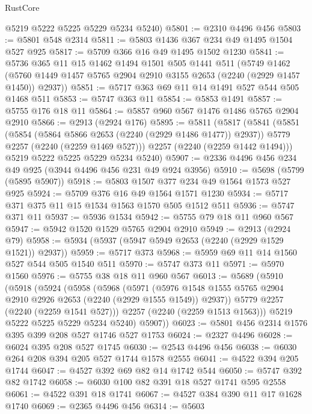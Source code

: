 \begin{lexlean}{RustCore}
\begin{coremodule}
      @5219
      @5222
      @5225
      @5229
      @5234
      @5240)
@5801 := @2310 @4496 @456
@5803 := @5801 @548 @2314
@5811 := @5803 @1436 @367 @234 @49 @1495 @1504 @527 @925
@5817 := @5709 @366 @16 @49 @1495 @1502 @1230
@5841 := @5736
    @365
    @11
    @15
    @1462
    @1494
    @1501
    @505
    @1441
    @511
    (@5749
      @1462
      (@5760 @1449 @1457 @5765 @2904 @2910 @3155 @2653 (@2240 (@2929 @1457 @1450)) @2937))
@5851 := @5717 @363 @69 @11 @14 @1491 @527 @544 @505 @1468 @511
@5853 := @5747 @363 @11
@5854 := @5853 @1491
@5857 := @5755 @176 @18 @11
@5864 := @5857 @960 @567 @1476 @1486 @5765 @2904 @2910
@5866 := @2913 (@2924 @176)
@5895 := @5811
    (@5817
      (@5841
        (@5851
          (@5854 (@5864 @5866 @2653 (@2240 (@2929 @1486 @1477)) @2937))
          @5779
          @2257
          (@2240 (@2259 @1469 @527)))
        @2257
        (@2240 (@2259 @1442 @1494)))
      @5219
      @5222
      @5225
      @5229
      @5234
      @5240)
@5907 := @2336 @4496 @456 @234 @49 @925 (@3944 @4496 @456 @231 @49 @924 @3956)
@5910 := @5698 (@5799 (@5895 @5907))
@5918 := @5803 @1507 @377 @234 @49 @1564 @1573 @527 @925
@5924 := @5709 @376 @16 @49 @1564 @1571 @1230
@5934 := @5717 @371 @375 @11 @15 @1534 @1563 @1570 @505 @1512 @511
@5936 := @5747 @371 @11
@5937 := @5936 @1534
@5942 := @5755 @79 @18 @11 @960 @567
@5947 := @5942 @1520 @1529 @5765 @2904 @2910
@5949 := @2913 (@2924 @79)
@5958 := @5934 (@5937 (@5947 @5949 @2653 (@2240 (@2929 @1529 @1521)) @2937))
@5959 := @5717 @373
@5968 := @5959 @69 @11 @14 @1560 @527 @544 @505 @1540 @511
@5970 := @5747 @373 @11
@5971 := @5970 @1560
@5976 := @5755 @38 @18 @11 @960 @567
@6013 := @5689
    (@5910
      (@5918
        (@5924
          (@5958
            (@5968
              (@5971
                (@5976 @1548 @1555 @5765 @2904 @2910 @2926 @2653 (@2240 (@2929 @1555 @1549)) @2937))
              @5779
              @2257
              (@2240 (@2259 @1541 @527)))
            @2257
            (@2240 (@2259 @1513 @1563)))
          @5219
          @5222
          @5225
          @5229
          @5234
          @5240)
        @5907))
@6023 := @5801 @456 @2314 @1576 @395 @399 @208 @527 @1746 @527 @1753
@6024 := @2327 @4496
@6028 := @6024 @395 @208 @527 @1745
@6030 := @2543 @4496 @456
@6038 := @6030 @264 @208 @394 @205 @527 @1744 @1578 @2555
@6041 := @4522 @394 @205 @1744
@6047 := @4527 @392 @69 @82 @14 @1742 @544
@6050 := @5747 @392 @82 @1742
@6058 := @6030 @100 @82 @391 @18 @527 @1741 @595 @2558
@6061 := @4522 @391 @18 @1741
@6067 := @4527 @384 @390 @11 @17 @1628 @1740
@6069 := @2365 @4496 @456
@6314 := @5603

\end{coremodule}
\end{lexlean}
